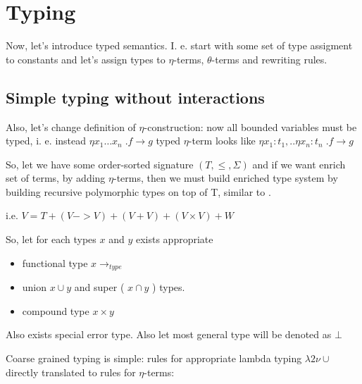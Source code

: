 \documentclass[10pt]{article}
\begin{document}
 
%
%
% 
%
%
%                              
%
%
%

   

\section{ Typing }

 Now, let's introduce typed semantics. I. e. start with some set of type assigment to
 constants and let's assign types to $\eta$-terms, $\theta$-terms and rewriting rules.

\subsection{Simple typing without interactions}

Also, let's change definition of $\eta$-construction: now all bounded variables must 
be typed, i. e. instead $\eta x_1 \dots x_n\;. f\to g$ typed $\eta$-term looks like
 $\eta x_1:t_1,..\eta x_{n}:t_{n}\;.f\to g$  

So, let we have some order-sorted signature $(T,\le,\Sigma)$  and if we want enrich set of 
terms, by adding $\eta$-terms, then we must build enriched type system by building
recursive polymorphic types on top of T, similar to \cite{Abadi89faithfulideal}.

i.e. $V=T + (V->V) + (V+V) + (V\times V)+W$

So, let for each types $x$ and $y$ exists appropriate
  \begin{itemize} 
   \item functional type $x\to_{type}$
   \item union $x \cup y$ and super ( $x \cap y$ ) types.
   \item compound type $x \times y$   
  \end{itemize} 
  Also exists special error type.  Also let most general type will be denoted as $\bot$

Coarse grained typing is simple: rules for appropriate lambda typing 
 $\lambda 2 \nu \cup$ \cite{800528} directly translated to rules for $\eta$-terms:
\end{document}
